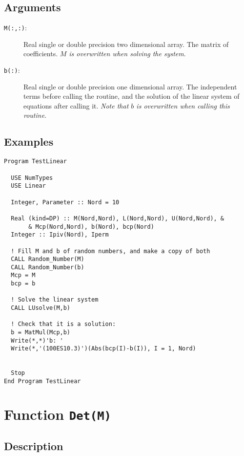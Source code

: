 \subsection{Arguments}

\begin{description}
\item[\texttt{M(:,:)}: ] Real single or double precision two
  dimensional array. The matrix of coefficients. \emph{$M$ is
    overwritten when solving the system}. 
\item[\texttt{b(:)}: ] Real single or double precision one dimensional
  array. The independent terms before calling the routine, and the
  solution of the linear system of equations after calling
  it. \emph{Note that $b$ is overwritten when calling this routine}.  
\end{description}

\subsection{Examples}

\begin{lstlisting}[emph=LUsolve,
                   emphstyle=\color{blue},
                   frame=trBL,
                   caption=Solving systems of linear equations.,
                   label=lusolve]
Program TestLinear

  USE NumTypes
  USE Linear

  Integer, Parameter :: Nord = 10

  Real (kind=DP) :: M(Nord,Nord), L(Nord,Nord), U(Nord,Nord), &
       & Mcp(Nord,Nord), b(Nord), bcp(Nord)
  Integer :: Ipiv(Nord), Iperm

  ! Fill M and b of random numbers, and make a copy of both
  CALL Random_Number(M)
  CALL Random_Number(b)
  Mcp = M
  bcp = b

  ! Solve the linear system
  CALL LUsolve(M,b)
  
  ! Check that it is a solution:
  b = MatMul(Mcp,b)
  Write(*,*)'b: '
  Write(*,'(100ES10.3)')(Abs(bcp(I)-b(I)), I = 1, Nord)


  Stop
End Program TestLinear
\end{lstlisting}


\section{Function \texttt{Det(M)}}

\subsection{Description}


